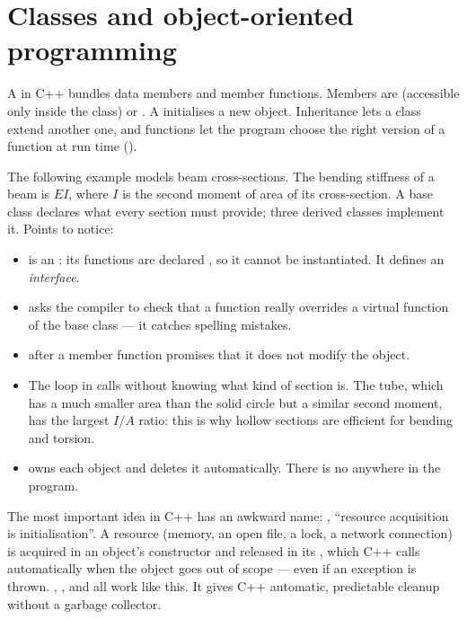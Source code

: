 \section{Classes and object-oriented programming}

A  in C++ bundles data members and member functions. Members are
 (accessible only inside the class) or . A 
initialises a new object. Inheritance lets a class extend another one, and 
functions let the program choose the right version of a function at run time
().

The following example models beam cross-sections. The bending stiffness of a beam is $EI$,
where $I$ is the second moment of area of its cross-section. A base class 
declares what every section must provide; three derived classes implement it.
Points to notice:
\begin{itemize}
\item {} is an : its functions are declared , so
  it cannot be instantiated. It defines an \emph{interface}.
\item {} asks the compiler to check that a function really overrides a
  virtual function of the base class --- it catches spelling mistakes.
\item {} after a member function promises that it does not modify the object.
\item The loop in  calls  without knowing what kind of section
   is. The tube, which has a much smaller area than the solid circle but a similar
  second moment, has the largest $I/A$ ratio: this is why hollow sections are efficient for
  bending and torsion.
\item {} owns each object and deletes it automatically. There is no
   anywhere in the program.
\end{itemize}

\begin{keyidea}
The most important idea in C++ has an awkward name: , ``resource acquisition
is initialisation''. A resource (memory, an open file, a lock, a network connection) is
acquired in an object's constructor and released in its , which C++ calls
automatically when the object goes out of scope --- even if an exception is thrown.
, ,  and 
all work like this. It gives C++ automatic, predictable cleanup without a garbage
collector.
\end{keyidea}

